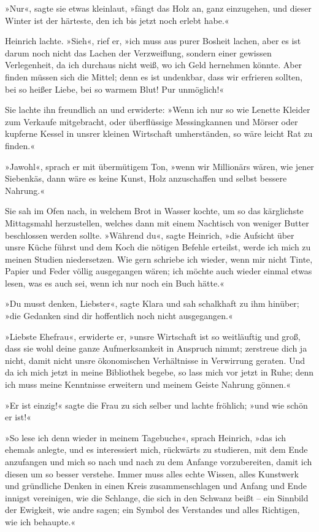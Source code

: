 »Nur«, sagte sie etwas kleinlaut, »fängt das Holz an, ganz einzugehen, und dieser Winter ist der härteste, den ich bis jetzt noch erlebt habe.«

Heinrich lachte. »Sieh«, rief er, »ich muss aus purer Bosheit lachen, aber es ist darum noch nicht das Lachen der Verzweiflung, sondern einer gewissen Verlegenheit, da ich durchaus nicht weiß, wo ich Geld hernehmen könnte. Aber finden müssen sich die Mittel; denn es ist undenkbar, dass wir erfrieren sollten, bei so heißer Liebe, bei so warmem Blut! Pur unmöglich!«

Sie lachte ihn freundlich an und erwiderte: »Wenn ich nur so wie Lenette Kleider zum Verkaufe mitgebracht, oder überflüssige Messingkannen und Mörser oder kupferne Kessel in unsrer kleinen Wirtschaft umherständen, so wäre leicht Rat zu finden.«

»Jawohl«, sprach er mit übermütigem Ton, »wenn wir Millionärs wären, wie jener Siebenkäs, dann wäre es keine Kunst, Holz anzuschaffen und selbst bessere Nahrung.«

Sie sah im Ofen nach, in welchem Brot in Wasser kochte, um so das kärglichste Mittagsmahl herzustellen, welches dann mit einem Nachtisch von weniger Butter beschlossen werden sollte. »Während du«, sagte Heinrich, »die Aufsicht über unsre Küche führst und dem Koch die nötigen Befehle erteilst, werde ich mich zu meinen Studien niedersetzen. Wie gern schriebe ich wieder, wenn mir nicht Tinte, Papier und Feder völlig ausgegangen wären; ich möchte auch wieder einmal etwas lesen, was es auch sei, wenn ich nur noch ein Buch hätte.«

»Du musst denken, Liebster«, sagte Klara und sah schalkhaft zu ihm hinüber; »die Gedanken sind dir hoffentlich noch nicht ausgegangen.«

»Liebste Ehefrau«, erwiderte er, »unsre Wirtschaft ist so weitläuftig und groß, dass sie wohl deine ganze Aufmerksamkeit in Anspruch nimmt; zerstreue dich ja nicht, damit nicht unsre ökonomischen Verhältnisse in Verwirrung geraten. Und da ich mich jetzt in meine Bibliothek begebe, so lass mich vor jetzt in Ruhe; denn ich muss meine Kenntnisse erweitern und meinem Geiste Nahrung gönnen.«

»Er ist einzig!« sagte die Frau zu sich selber und lachte fröhlich; »und wie schön er ist!«

»So lese ich denn wieder in meinem Tagebuche«, sprach Heinrich, »das ich ehemals anlegte, und es interessiert mich, rückwärts zu studieren, mit dem Ende anzufangen und mich so nach und nach zu dem Anfange vorzubereiten, damit ich diesen um so besser verstehe. Immer muss alles echte Wissen, alles Kunstwerk und gründliche Denken in einen Kreis zusammenschlagen und Anfang und Ende innigst vereinigen, wie die Schlange, die sich in den Schwanz beißt – ein Sinnbild der Ewigkeit, wie andre sagen; ein Symbol des Verstandes und alles Richtigen, wie ich behaupte.«

